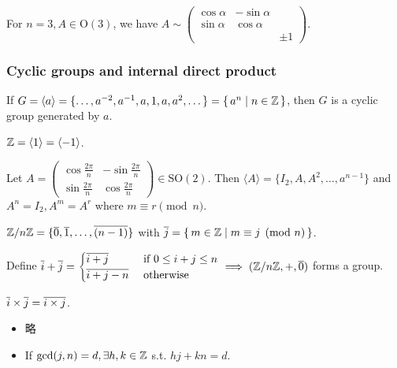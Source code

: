 For $n = 3, A \in \text{O}(3)$, we have $A \sim \begin{pmatrix}
  \cos\alpha & -\sin\alpha & \\
  \sin\alpha & \cos\alpha & \\
   & & \pm 1
\end{pmatrix}$.

\subsubsection{Cyclic groups and internal direct product}

\begin{definition}
  If $G = \langle a \rangle = \{ \dots, a^{-2}, a^{-1}, a, 1, a, a^2, \dots \}
  = \{\, a^n \mid n \in \mathbb{Z} \,\}$, then $G$ is a cyclic group generated by $a$.
\end{definition}

\begin{example}
  $\mathbb{Z} = \langle 1 \rangle = \langle -1 \rangle$.
\end{example}

\begin{example}
  Let $A = \begin{pmatrix}
    \cos \frac{2\pi}{n} & -\sin \frac{2\pi}{n} \\ 
    \sin \frac{2\pi}{n} & \cos \frac{2\pi}{n}
  \end{pmatrix} \in \text{SO}(2)$. Then $\langle A \rangle =
  \{ I_2, A, A^2, \dots, a^{n-1} \}$ and $A^n = I_2, A^m = A^r$ where
  $m \equiv r \pmod n$.
\end{example}

\begin{example}
  $\mathbb{Z} / n\mathbb{Z} = \{ \overline{0}, \overline{1}, \dots, \overline{(n-1)} \}$ with
  $\overline{j} = \{\, m \in \mathbb{Z} \mid m \equiv j \pmod n \,\}$.

  Define $\overline{i} + \overline{j} = \begin{cases}
    \overline{i+j} & \text{~if~} 0 \le i + j \le n \\
    \overline{i+j-n} & \text{~otherwise}
  \end{cases} \implies (\mathbb{Z} / n\mathbb{Z}, +, \overline{0})$ forms a group.
\end{example}

\begin{remark}
  $\overline{i} \times \overline{j} = \overline{i \times j}$.
  \begin{itemize}
    \item 略
    \item If $\gcd(j, n) = d, \exists h, k \in \mathbb{Z}$ s.t. $hj + kn = d$.
  \end{itemize}
\end{remark}

